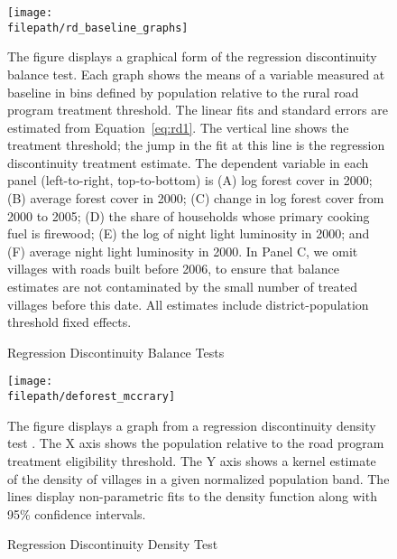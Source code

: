 \begin{figure}[H]
\caption{Regression Discontinuity Balance Tests}
\label{fig:rd_balance}
\begin{center}
\texttt{[image: \\filepath/rd\_baseline\_graphs]}  \\
\end{center}
\newline
\footnotesize{The figure displays a graphical form of the regression
  discontinuity balance test. Each graph shows the means of a variable
  measured at baseline in bins defined by population relative to the
  rural road program treatment threshold. The linear fits and standard
  errors are estimated from Equation~\ref{eq:rd1}. The vertical line
  shows the treatment threshold; the jump in the fit at this line is
  the regression discontinuity treatment estimate. The dependent
  variable in each panel (left-to-right, top-to-bottom) is (A) log
  forest cover in 2000; (B) average forest cover in 2000; (C) change
  in log forest cover from 2000 to 2005; (D) the share of households
  whose primary cooking fuel is firewood; (E) the log of night light
  luminosity in 2000; and (F) average night light luminosity in
  2000. In Panel C, we omit villages with roads built before 2006, to
  ensure that balance estimates are not contaminated by the small
  number of treated villages before this date. All estimates include
  district-population threshold fixed effects.}
\end{figure}

\begin{figure}[H]
\caption{Regression Discontinuity Density Test}
\label{fig:rd_mccrary}
\begin{center}
\texttt{[image: \\filepath/deforest\_mccrary]}  \\
\end{center}
\newline
\footnotesize{The figure displays a graph from a regression
  discontinuity density test \cite{MC08}. The X axis shows the
  population relative to the road program treatment eligibility
  threshold. The Y axis shows a kernel estimate of the density of
  villages in a given normalized population band. The lines display
  non-parametric fits to the density function along with 95\%
  confidence intervals.}
\end{figure}

